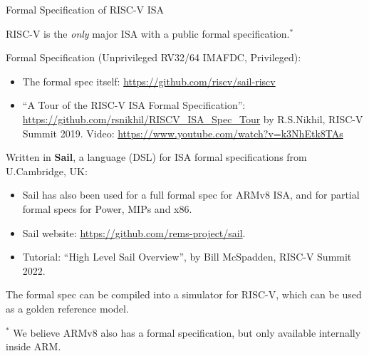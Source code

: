 \documentclass{article}
\begin{document}
\clearpage


\begin{center}
  {\Huge
    Formal Specification of RISC-V ISA}

  \vspace*{0.5in}

  \begin{minipage}{9in}\LARGE
    RISC-V is the \emph{only} major ISA with a public formal specification.$^*$

    \vspace{3ex}

    Formal Specification (Unprivileged RV32/64 IMAFDC, Privileged):
    \begin{itemize}
    \item The formal spec itself: \url{https://github.com/riscv/sail-riscv}

    \item ``A Tour of the RISC-V ISA Formal Specification'':
      \url{https://github.com/rsnikhil/RISCV_ISA_Spec_Tour} by
      R.S.Nikhil, RISC-V Summit 2019.
      Video: \url{https://www.youtube.com/watch?v=k3NhEtk8TAs}
    \end{itemize}

    \vspace{1ex}

    Written in {\bf Sail}, a language (DSL) for ISA formal specifications from U.Cambridge, UK:
    \begin{itemize}
    \item Sail has also been used for a full formal spec for ARMv8
      ISA, and for partial formal specs for Power, MIPs and x86.
    \item Sail website: \url{https://github.com/rems-project/sail}.
    \item Tutorial: ``High Level Sail Overview'', by Bill McSpadden, RISC-V Summit 2022.
    \end{itemize}

    \vspace{1ex}

    The formal spec can be compiled into a simulator for RISC-V, which
    can be used as a golden reference model.

  \end{minipage}

  \vfill

  \begin{minipage}{9in}\LARGE
    {\Large
    $^*$ We believe ARMv8 also has a formal specification, but only available internally inside ARM.}
  \end{minipage}


\end{center}
\end{document}
